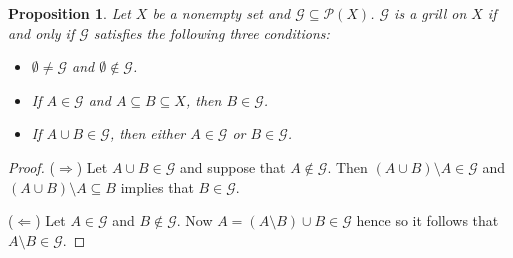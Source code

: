 \documentclass[12pt]{article}
\theoremstyle{plain}
\newtheorem{prop}[thm]{Proposition}
\theoremstyle{definition}
\newcommand{\calG}{\mathcal{G}}
\newcommand{\calP}{\mathcal{P}}
\begin{document}
\begin{prop}
  Let $X$ be a nonempty set and $\calG \subseteq \calP(X)$.
  $\calG$ is a grill on $X$ if and only if $\calG$ satisfies the
  following three conditions:
  \begin{itemize}
    \item[(1)] $\emptyset \ne \calG$ and $\emptyset \not\in \calG$.

    \item[(2)] If $A \in \calG$ and $A \subseteq B \subseteq X$, then
       $B \in \calG$.

    \item[(3)] If $A \cup B \in \calG$, then either $A \in \calG$ or 
       $B \in \calG$. 
  \end{itemize}
\end{prop}
\begin{proof}
  ($\Rightarrow$)
  Let $A \cup B \in \calG$ and suppose that $A \not \in \calG$.
  Then $(A \cup B) \setminus A \in \calG$ and $(A \cup B) \setminus A
  \subseteq B$ implies that $B \in \calG$.

  ($\Leftarrow$)
  Let $A \in \calG$ and $B \not\in \calG$.
  Now $A = (A \setminus B) \cup B \in \calG$ hence so it follows that
  $A \setminus B \in \calG$.
\end{proof}
\end{document}
